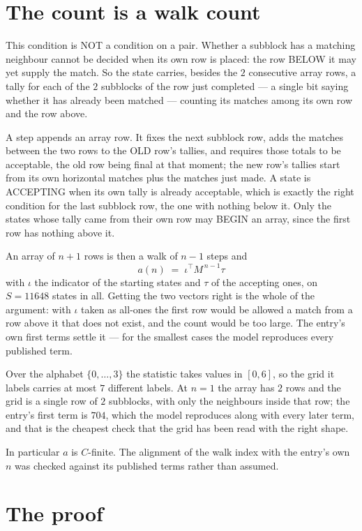 \documentclass[11pt,a4paper]{article}
\theoremstyle{plain}
\theoremstyle{definition}
\begin{document}
\section{The count is a walk count}

This condition is NOT a condition on a pair. Whether a subblock has a
matching neighbour cannot be decided when its own row is placed: the row BELOW it may yet
supply the match. So the state carries, besides the $2$ consecutive array rows, a tally for
each of the $2$ subblocks of the row just completed --- a single bit saying whether it has already been matched --- counting its matches
among its own row and the row above.

A step appends an array row. It fixes the next subblock row, adds the matches between the two
rows to the OLD row's tallies, and requires those totals to be acceptable, the old row being
final at that moment; the new row's tallies start from its own horizontal matches plus the
matches just made. A state is ACCEPTING when its own tally is already acceptable, which is
exactly the right condition for the last subblock row, the one with nothing below it. Only the
states whose tally came from their own row may BEGIN an array, since the first row has nothing
above it.

An array of $n+1$ rows is then a walk of $n-1$ steps and
\[
a(n)\;=\;\iota^{\!\top}M^{\,n-1}\tau
\]
with $\iota$ the indicator of the starting states and $\tau$ of the accepting ones, on
$S=11648$ states in all. Getting the two vectors right is the whole of the argument: with
$\iota$ taken as all-ones the first row would be allowed a match from a row above it that does
not exist, and the count would be too large. The entry's own first terms settle it --- for
the smallest cases
the model reproduces every published term.

Over the alphabet $\{0,\dots,3\}$ the statistic takes values in $[0,6]$, so the
grid it labels carries at most $7$ different labels. At $n=1$ the array has $2$
rows and the grid is a single row of $2$
subblocks, with only the neighbours inside that row; the entry's first term is
$704$, which the model reproduces along with every later term, and that is the cheapest
check that the grid has been read with the right shape.

In particular $a$ is $C$-finite. The alignment of the walk index with the entry's own $n$ was
checked against its published terms rather than assumed.

\section{The proof}
\end{document}
